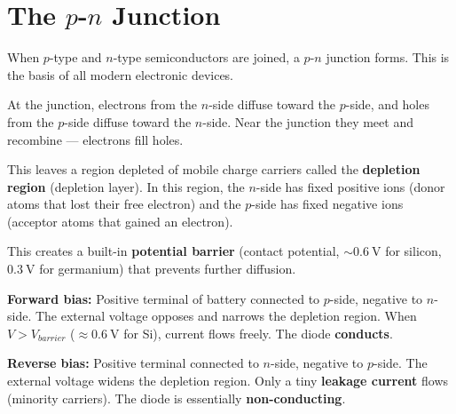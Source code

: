 \begin{diagbox}
\begin{center}
\end{center}
\end{diagbox}

\section{The \texorpdfstring{$p$-$n$}{p-n} Junction}

When $p$-type and $n$-type semiconductors are joined,
a $p$-$n$ junction forms. This is the basis of all
modern electronic devices.

\begin{processbox}
At the junction, electrons from the $n$-side diffuse
toward the $p$-side, and holes from the $p$-side
diffuse toward the $n$-side. Near the junction they
meet and recombine --- electrons fill holes.

This leaves a region depleted of mobile charge
carriers called the \textbf{depletion region}
(depletion layer). In this region, the $n$-side
has fixed positive ions (donor atoms that lost their
free electron) and the $p$-side has fixed negative
ions (acceptor atoms that gained an electron).

This creates a built-in \textbf{potential barrier}
(contact potential, $\sim 0.6\ \text{V}$ for silicon,
$0.3\ \text{V}$ for germanium) that prevents further
diffusion.
\end{processbox}

\begin{lawbox}
\textbf{Forward bias:} Positive terminal of battery
connected to $p$-side, negative to $n$-side.
The external voltage opposes and narrows the depletion
region. When $V > V_{barrier}$ ($\approx 0.6\ \text{V}$
for Si), current flows freely. The diode \textbf{conducts}.

\textbf{Reverse bias:} Positive terminal connected to
$n$-side, negative to $p$-side.
The external voltage widens the depletion region.
Only a tiny \textbf{leakage current} flows (minority
carriers). The diode is essentially \textbf{non-conducting}.
\end{lawbox}

